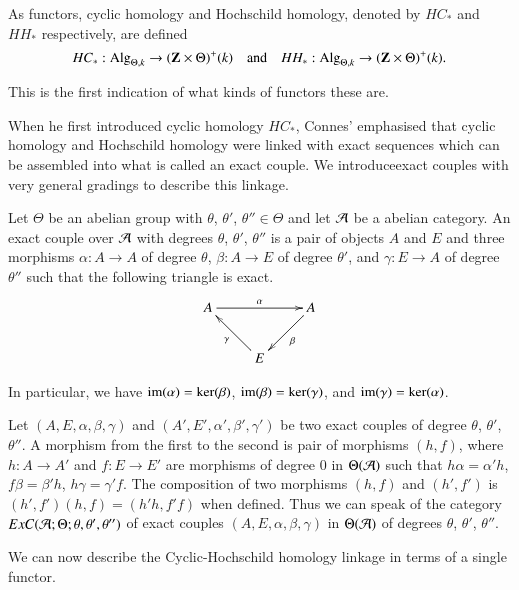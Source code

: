 \begin{remark}\label{chap1-rem3.3}
As functors, cyclic homology and Hochschild homology, denoted by
$HC_{\ast}$ and $HH_{\ast}$ respectively, are defined
$$
HC_{\ast}:\operatorname{Alg}_{\Theta,k}\to (\mathbf{Z}\times\Theta)^{+}(k)\quad\text{and}\quad
HH_{\ast}:\operatorname{Alg}_{\Theta,k}\to (\mathbf{Z}\times\Theta)^{+}(k). 
$$

This is the first indication of what kinds of functors these are.
\end{remark}

When he first introduced cyclic homology $HC_{\ast}$, Connes'
emphasised that cyclic homology and Hochschild homology were linked
with exact sequences which can be assembled into what is called an
exact couple. We introduce\pageoriginale exact couples with very
general gradings to describe this linkage.

\begin{definition}\label{chap1-defi3.4}
Let $\Theta$ be an abelian group with $\theta$, $\theta'$,
$\theta''\in\Theta$ and let $\mathcal{A}$ be a abelian category. An exact
couple over $\mathcal{A}$ with degrees $\theta$, $\theta'$, $\theta''$ is a
pair of objects $A$ and $E$ and three morphisms $\alpha:A\to A$ of
degree $\theta$, $\beta:A\to E$ of degree $\theta'$, and $\gamma:E\to
A$ of degree $\theta''$ such that the following triangle is
exact.
\[
\xymatrix{
A\ar[rr]^-{\alpha} & & A\ar[dl]^-{\beta}\\
 & E\ar[ul]^-{\gamma} & 
}
\]

In particular, we have $\operatorname{im}(\alpha)=\ker(\beta)$,
$\operatorname{im}(\beta)=\ker(\gamma)$, and $\operatorname{im}(\gamma)=\ker(\alpha)$. 
\end{definition}

Let $(A,E,\alpha,\beta,\gamma)$ and $(A',E',\alpha',\beta',\gamma')$
be two exact couples of degree $\theta$, $\theta'$, $\theta''$. A
morphism from the first to the second is pair of morphisms $(h,f)$,
where $h:A\to A'$ and $f:E\to E'$ are morphisms of degree $0$ in
$\Theta(\mathcal{A})$ such that $h\alpha=\alpha'h$, $f\beta=\beta'h$,
$h\gamma=\gamma'f$. The composition of two morphisms $(h,f)$ and
$(h',f')$ is $(h',f')(h,f)=(h'h,f'f)$ when defined. Thus we can speak
of the category $ExC(\mathcal{A};\Theta;\theta,\theta',\theta'')$ of exact
couples $(A,E,\alpha,\beta,\gamma)$ in $\Theta(\mathcal{A})$ of degrees
$\theta$, $\theta'$, $\theta''$. 

We can now describe the Cyclic-Hochschild homology linkage in terms of a single functor.

